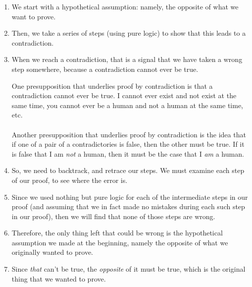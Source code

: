 \documentclass[../../../main.tex]{subfiles}
\begin{document}
\begin{enumerate}

  \item We start with a hypothetical assumption: namely, the opposite of what we want to prove.

  \item Then, we take a series of steps (using pure logic) to show that this leads to a contradiction.
  
  \item When we reach a contradiction, that is a signal that we have taken a wrong step somewhere, because a contradiction cannot ever be true.
  
\begin{aside}
  \begin{remark}
    One presupposition that underlies proof by contradiction is that a contradiction cannot ever be true. I cannot ever exist and not exist at the same time, you cannot ever be a human and not a human at the same time, etc. \\~\\
    
    Another presupposition that underlies proof by contradiction is the idea that if one of a pair of a contradictories is false, then the other must be true. If it is false that I am \emph{not} a human, then it must be the case that I \emph{am} a human.
  \end{remark}
\end{aside}
  
  \item So, we need to backtrack, and retrace our steps. We must examine each step of our proof, to see where the error is. 
  
  \item Since we used nothing but pure logic for each of the intermediate steps in our proof (and assuming that we in fact made no mistakes during each such step in our proof), then we will find that none of those steps are wrong.
  
  \item Therefore, the only thing left that could be wrong is the hypothetical assumption we made at the beginning, namely the opposite of what we originally wanted to prove.
  
  \item Since \emph{that} can't be true, the \emph{opposite} of it must be true, which is the original thing that we wanted to prove.

\end{enumerate}
\end{document}
